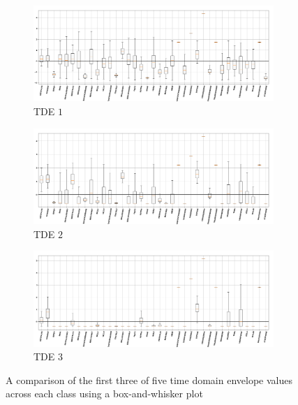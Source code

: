 \documentclass[12pt,letterpaper]{article}
\begin{document}
\begin{figure}[H]

	\begin{subfigure}{1.0\textwidth}
	\centering
	\includegraphics[width=\textwidth , height=0.2\textheight]
		{../FiguresFeatures/TDE_1}
	\caption{TDE $1$}
	\end{subfigure}
	
	\begin{subfigure}{1.0\textwidth}
	\centering
	\includegraphics[width=\textwidth , height=0.2\textheight]
		{../FiguresFeatures/TDE_2}
	\caption{TDE $2$}
	\end{subfigure}
	
	\begin{subfigure}{1.0\textwidth}
	\centering
	\includegraphics[width=\textwidth , height=0.2\textheight]
		{../FiguresFeatures/TDE_3}
	\caption{TDE $3$}
	\end{subfigure}
		
\caption{A comparison of the first three of five time domain envelope values across each class using a box-and-whisker plot}
\label{fig-FeatureTDE}
\end{figure}
\end{document}
